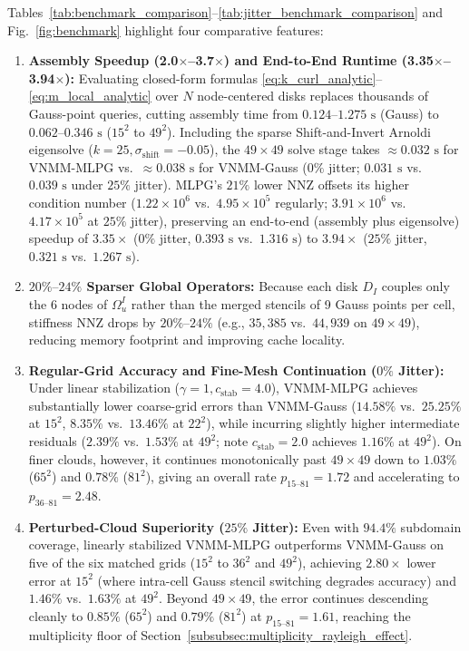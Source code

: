 \documentclass[VANCOUVER]{USG}
\begin{document}
Tables~\ref{tab:benchmark_comparison}--\ref{tab:jitter_benchmark_comparison} and Fig.~\ref{fig:benchmark} highlight four comparative features:
\begin{enumerate}
    \item \textbf{Assembly Speedup (2.0$\times$--3.7$\times$) and End-to-End Runtime (3.35$\times$--3.94$\times$):} Evaluating closed-form formulas \eqref{eq:k_curl_analytic}--\eqref{eq:m_local_analytic} over $N$ node-centered disks replaces thousands of Gauss-point queries, cutting assembly time from $0.124\text{--}1.275\text{ s}$ (Gauss) to $0.062\text{--}0.346\text{ s}$ ($15^2$ to $49^2$). Including the sparse Shift-and-Invert Arnoldi eigensolve ($k = 25, \sigma_{\mathrm{shift}} = -0.05$), the $49\times 49$ solve stage takes $\approx 0.032\text{ s}$ for VNMM-MLPG vs.\ $\approx 0.038\text{ s}$ for VNMM-Gauss ($0\%$ jitter; $0.031\text{ s}$ vs.\ $0.039\text{ s}$ under $25\%$ jitter). MLPG's $21\%$ lower NNZ offsets its higher condition number ($1.22\times 10^6$ vs.\ $4.95\times 10^5$ regularly; $3.91\times 10^6$ vs.\ $4.17\times 10^5$ at $25\%$ jitter), preserving an end-to-end (assembly plus eigensolve) speedup of $3.35\times$ ($0\%$ jitter, $0.393\text{ s}$ vs.\ $1.316\text{ s}$) to $3.94\times$ ($25\%$ jitter, $0.321\text{ s}$ vs.\ $1.267\text{ s}$).
    \item \textbf{$20\%\text{--}24\%$ Sparser Global Operators:} Because each disk $D_I$ couples only the 6 nodes of $\Omega_u^I$ rather than the merged stencils of 9 Gauss points per cell, stiffness NNZ drops by $20\%\text{--}24\%$ (e.g., $35,385$ vs.\ $44,939$ on $49\times 49$), reducing memory footprint and improving cache locality.
    \item \textbf{Regular-Grid Accuracy and Fine-Mesh Continuation ($0\%$ Jitter):} Under linear stabilization ($\gamma = 1, c_{\mathrm{stab}} = 4.0$), VNMM-MLPG achieves substantially lower coarse-grid errors than VNMM-Gauss ($14.58\%$ vs.\ $25.25\%$ at $15^2$, $8.35\%$ vs.\ $13.46\%$ at $22^2$), while incurring slightly higher intermediate residuals ($2.39\%$ vs.\ $1.53\%$ at $49^2$; note $c_{\mathrm{stab}} = 2.0$ achieves $1.16\%$ at $49^2$). On finer clouds, however, it continues monotonically past $49\times 49$ down to $1.03\%$ ($65^2$) and $\mathbf{0.78\%}$ ($81^2$), giving an overall rate $p_{15\text{--}81} = 1.72$ and accelerating to $p_{36\text{--}81} = 2.48$.
    \item \textbf{Perturbed-Cloud Superiority ($25\%$ Jitter):} Even with $94.4\%$ subdomain coverage, linearly stabilized VNMM-MLPG outperforms VNMM-Gauss on five of the six matched grids ($15^2$ to $36^2$ and $49^2$), achieving $2.80\times$ lower error at $15^2$ (where intra-cell Gauss stencil switching degrades accuracy) and $1.46\%$ vs.\ $1.63\%$ at $49^2$. Beyond $49\times 49$, the error continues descending cleanly to $0.85\%$ ($65^2$) and $0.79\%$ ($81^2$) at $p_{15\text{--}81} = 1.61$, reaching the multiplicity floor of Section~\ref{subsubsec:multiplicity_rayleigh_effect}.
\end{enumerate}
\end{document}

